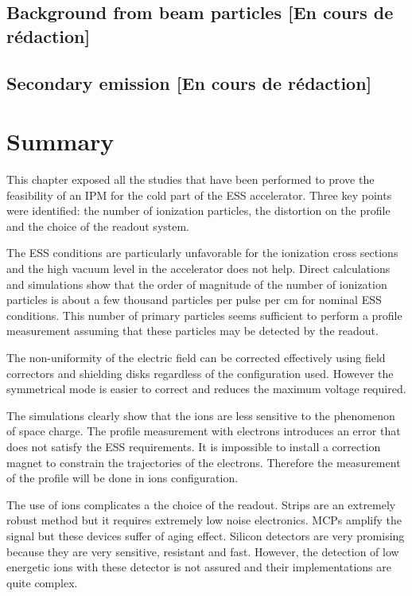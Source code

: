 \begin{refsection}
  \subsection{Background from beam particles [En cours de rédaction]}
  \subsection{Secondary emission [En cours de rédaction]}

  \section{Summary}
  \label{ch3:Summary}
  This chapter exposed all the studies that have been performed to prove the feasibility of an IPM for the cold part of the ESS accelerator. Three key points were identified: the number of ionization particles, the distortion on the profile and the choice of the readout system.

  The ESS conditions are particularly unfavorable for the ionization cross sections and the high vacuum level in the accelerator does not help. Direct calculations and simulations show that the order of magnitude of the number of ionization particles is about a few thousand particles per pulse per cm for nominal ESS conditions. This number of primary particles seems sufficient to perform a profile measurement assuming that these particles may be detected by the readout.
  
  The non-uniformity of the electric field can be corrected effectively using field correctors and shielding disks regardless of the configuration used. However the symmetrical mode is easier to correct and reduces the maximum voltage required.
  
  The simulations clearly show that the ions are less sensitive to the phenomenon of space charge. The profile measurement with electrons introduces an error that does not satisfy the ESS requirements. It is impossible to install a correction magnet to constrain the trajectories of the electrons. Therefore the measurement of the profile will be done in ions configuration.
  
  The use of ions complicates a the choice of the readout. Strips are an extremely robust method but it requires extremely low noise electronics. MCPs amplify the signal but these devices suffer of aging effect. Silicon detectors are very promising because they are very sensitive, resistant and fast. However, the detection of low energetic ions with these detector is not assured and their implementations are quite complex.


\end{refsection}
